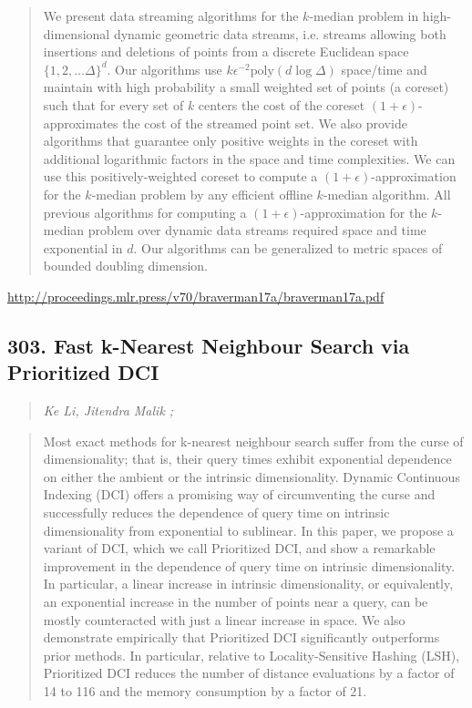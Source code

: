 \documentclass{article}
\begin{document}
\begin{quote}
    We present data streaming algorithms for the $k$-median problem in high-dimensional dynamic geometric data streams, i.e. streams allowing both insertions and deletions of points from a discrete Euclidean space $\{1, 2, \ldots \Delta\}^d$. Our algorithms use $k \epsilon^{-2} \mathrm{poly}(d \log \Delta)$ space/time and maintain with high probability a small weighted set of points (a coreset) such that for every set of $k$ centers the cost of the coreset $(1+\epsilon)$-approximates the cost of the streamed point set. We also provide algorithms that guarantee only positive weights in the coreset with additional logarithmic factors in the space and time complexities. We can use this positively-weighted coreset to compute a $(1+\epsilon)$-approximation for the $k$-median problem by any efficient offline $k$-median algorithm. All previous algorithms for computing a $(1+\epsilon)$-approximation for the $k$-median problem over dynamic data streams required space and time exponential in $d$. Our algorithms can be generalized to metric spaces of bounded doubling dimension.  \end{quote}

\href{http://proceedings.mlr.press/v70/braverman17a/braverman17a.pdf}{http://proceedings.mlr.press/v70/braverman17a/braverman17a.pdf}

\subsection{303. Fast k-Nearest Neighbour Search via Prioritized DCI}

\begin{quote}
\footnotesize{\textit{Ke Li, Jitendra Malik ;}}
\end{quote}

\begin{quote}
    Most exact methods for k-nearest neighbour search suffer from the curse of dimensionality; that is, their query times exhibit exponential dependence on either the ambient or the intrinsic dimensionality. Dynamic Continuous Indexing (DCI) offers a promising way of circumventing the curse and successfully reduces the dependence of query time on intrinsic dimensionality from exponential to sublinear. In this paper, we propose a variant of DCI, which we call Prioritized DCI, and show a remarkable improvement in the dependence of query time on intrinsic dimensionality. In particular, a linear increase in intrinsic dimensionality, or equivalently, an exponential increase in the number of points near a query, can be mostly counteracted with just a linear increase in space. We also demonstrate empirically that Prioritized DCI significantly outperforms prior methods. In particular, relative to Locality-Sensitive Hashing (LSH), Prioritized DCI reduces the number of distance evaluations by a factor of 14 to 116 and the memory consumption by a factor of 21.  \end{quote}
\end{document}
